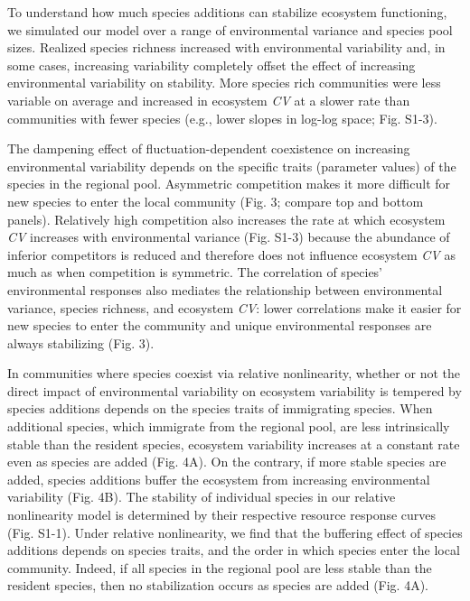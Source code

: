 \documentclass[12pt,]{article}
\begin{document}
To understand how much species additions can stabilize ecosystem
functioning, we simulated our model over a range of environmental
variance and species pool sizes. Realized species richness increased
with environmental variability and, in some cases, increasing
variability completely offset the effect of increasing environmental
variability on stability. More species rich communities were less
variable on average and increased in ecosystem \emph{CV} at a slower
rate than communities with fewer species (e.g., lower slopes in log-log
space; Fig. S1-3).

The dampening effect of fluctuation-dependent coexistence on increasing
environmental variability depends on the specific traits (parameter
values) of the species in the regional pool. Asymmetric competition
makes it more difficult for new species to enter the local community
(Fig. 3; compare top and bottom panels). Relatively high competition
also increases the rate at which ecosystem \emph{CV} increases with
environmental variance (Fig. S1-3) because the abundance of inferior
competitors is reduced and therefore does not influence ecosystem
\emph{CV} as much as when competition is symmetric. The correlation of
species' environmental responses also mediates the relationship between
environmental variance, species richness, and ecosystem \emph{CV}: lower
correlations make it easier for new species to enter the community and
unique environmental responses are always stabilizing (Fig. 3).

In communities where species coexist via relative nonlinearity, whether
or not the direct impact of environmental variability on ecosystem
variability is tempered by species additions depends on the species
traits of immigrating species. When additional species, which immigrate
from the regional pool, are less intrinsically stable than the resident
species, ecosystem variability increases at a constant rate even as
species are added (Fig. 4A). On the contrary, if more stable species are
added, species additions buffer the ecosystem from increasing
environmental variability (Fig. 4B). The stability of individual species
in our relative nonlinearity model is determined by their respective
resource response curves (Fig. S1-1). Under relative nonlinearity, we
find that the buffering effect of species additions depends on species
traits, and the order in which species enter the local community.
Indeed, if all species in the regional pool are less stable than the
resident species, then no stabilization occurs as species are added
(Fig. 4A).
\end{document}
